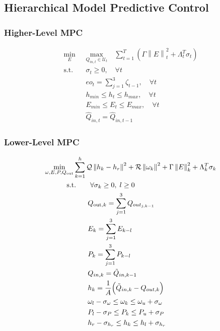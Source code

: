 \subsection{Hierarchical Model Predictive Control}
	\subsubsection{Higher-Level MPC}


\begin{subequations}\label{P0:min_max}
	\begin{align}
		\underset{E}{\text{min}} & \underset{Q_{in,t} \in \mathcal{U}_t}{\text{max}} \quad \sum_{t=1}^{T} \left( \Gamma \left\lVert E \right\rVert^{2}_{t} + \Lambda_t^T \sigma_t \right) \label{P0:min_max_1} \\
		\text{s.t.} \quad & \sigma_t \geq 0, \quad \forall t \label{P0:min_max_2} \\
		& eo_{t} = \sum_{j=1}^3 \zeta_{t-1}, \quad \forall t \label{P0:min_max_3} \\
		& h_{min} \leq h_{t} \leq h_{max}, \quad \forall t \label{P0:min_max_5} \\
		& E_{min} \leq E_{t} \leq E_{max}, \quad \forall t \label{P0:min_max_6} \\
		& \hat{Q}_{in,t} = \hat{Q}_{in,t-1} \label{P0:min_max_7}
	\end{align}
	\end{subequations}

\subsubsection{Lower-Level MPC}
	\begin{subequations}\label{P2:FinalModel}
		\begin{align}
			\underset{\omega, E, P, Q_{\text{out}}}{\text{min}}& \sum_{k=1}^{h} \mathcal{Q} \left\lVert h_k - h_r \right\rVert^2 + \mathcal{R} \left\lVert \omega_k \right\rVert^2 + \Gamma \left\lVert E \right\rVert^{2}_{k} + \Lambda_k^T \sigma_k  \label{P1:lower_mpc} \\
			&\hspace{-1em} \text{s.t.}  \quad \quad \forall \sigma_k \geq 0, \; l \geq 0 \label{P1:1} \\
			& \qquad Q_{\text{out}, k} = \sum_{j=1}^3 Q_{out_{j,k-1}} \label{P1:2} \\
			& \qquad E_{k} = \sum_{j=1}^3 E_{k-l} \label{P1:3}  \\
			& \qquad P_{k} = \sum_{j=1}^3 P_{k-l} \label{P1:4}  \\
			& \qquad Q_{in,k} = \tilde{Q}_{in,k-1} \label{P1:5}  \\
			& \qquad h_k = \frac{1}{A} \Big(\tilde{Q}_{in,k} - Q_{out,k}\Big) \label{P1:6} \\
			& \qquad \omega_{l} - \sigma_{\omega} \leq \omega_k \leq \omega_{u} + \sigma_{\omega} \label{P1:7} \\
			& \qquad P_{l} - \sigma_{P} \leq P_k \leq P_{u} + \sigma_{P} \label{P1:8} \\
			& \qquad h_{r} - \sigma_{h_{r}} \leq h_k \leq h_{l} + \sigma_{h_{r}} \label{P1:9}
	\end{align}
	\end{subequations}